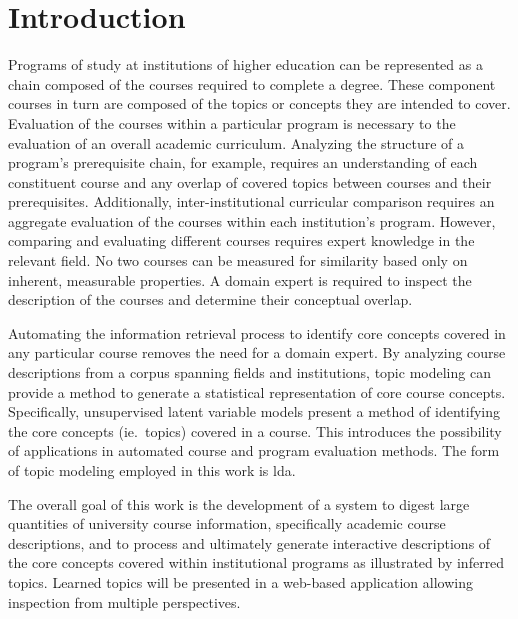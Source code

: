 \section{Introduction}
\label{sec:introduction}


Programs of study at institutions of higher education can be represented as a chain composed of the courses required to complete a degree.
These component courses in turn are composed of the topics or concepts they are intended to cover.
Evaluation of the courses within a particular program is necessary to the evaluation of an overall academic curriculum.
Analyzing the structure of a program's prerequisite chain, for example, requires an understanding of each constituent course and any overlap of covered topics between courses and their prerequisites.
Additionally, inter-institutional curricular comparison requires an aggregate evaluation of the courses within each institution's program.
However, comparing and evaluating different courses requires expert knowledge in the relevant field.
No two courses can be measured for similarity based only on inherent, measurable properties.
A domain expert is required to inspect the description of the courses and determine their conceptual overlap.


Automating the information retrieval process to identify core concepts covered in any particular course removes the need for a domain expert.
By analyzing course descriptions from a corpus spanning fields and institutions, topic modeling can provide a method to generate a statistical representation of core course concepts.
Specifically, unsupervised latent variable models present a method of identifying the core concepts (ie.\ topics) covered in a course.
This introduces the possibility of applications in automated course and program evaluation methods.
The form of topic modeling employed in this work is \acf{lda}.


The overall goal of this work is the development of a system to digest large quantities of university course information, specifically academic course descriptions, and to process and ultimately generate interactive descriptions of the core concepts covered within institutional programs as illustrated by inferred topics.
Learned topics will be presented in a web-based application allowing inspection from multiple perspectives.


